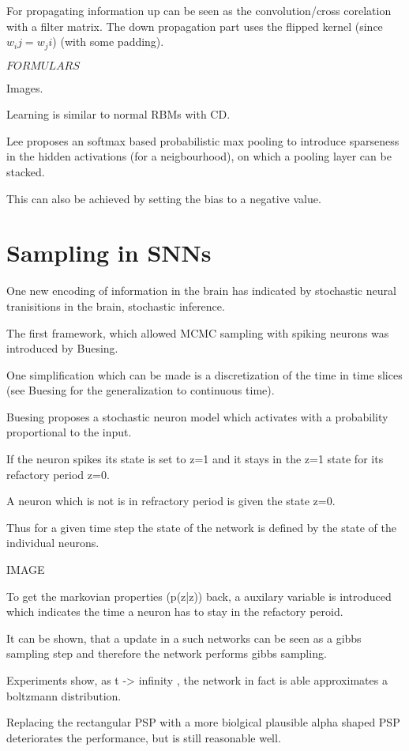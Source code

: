 For propagating information up can be seen as the convolution/cross corelation with a filter matrix. 
The down propagation part uses the flipped kernel (since $w_ij = w_ji$) (with some padding).

$FORMULARS$

Images.

Learning is similar to normal RBMs with CD.

Lee proposes an softmax based probabilistic max pooling to introduce sparseness in the hidden activations (for a neigbourhood), on which a pooling layer can be stacked.

This can also be achieved by setting the bias to a negative value. 

\section{Sampling in SNNs}

One new encoding of information in the brain has indicated by stochastic neural tranisitions in the brain, stochastic inference. 

The first framework, which allowed MCMC sampling with spiking neurons was introduced by Buesing.

One simplification which can be made is a discretization of the time in time slices (see Buesing for the generalization to continuous time).

Buesing proposes a stochastic neuron model which activates with a probability proportional to the input.

If the neuron spikes its state is set to z=1 and it stays in the z=1 state for its refactory period z=0. 

A neuron which is not is in refractory period is given the state z=0. 

Thus for a given time step the state of the network is defined by the state of the individual neurons. 

IMAGE

To get the markovian properties (p(z|z)) back, a auxilary variable is introduced which indicates the time a neuron has to stay in the refactory peroid.

It can be shown, that a update in a such networks can be seen as a gibbs sampling step and therefore the network performs gibbs sampling.

Experiments show, as t -> infinity , the network in fact is able approximates a boltzmann distribution.

Replacing the rectangular PSP with a more biolgical plausible alpha shaped PSP deteriorates the performance, but is still reasonable well.

